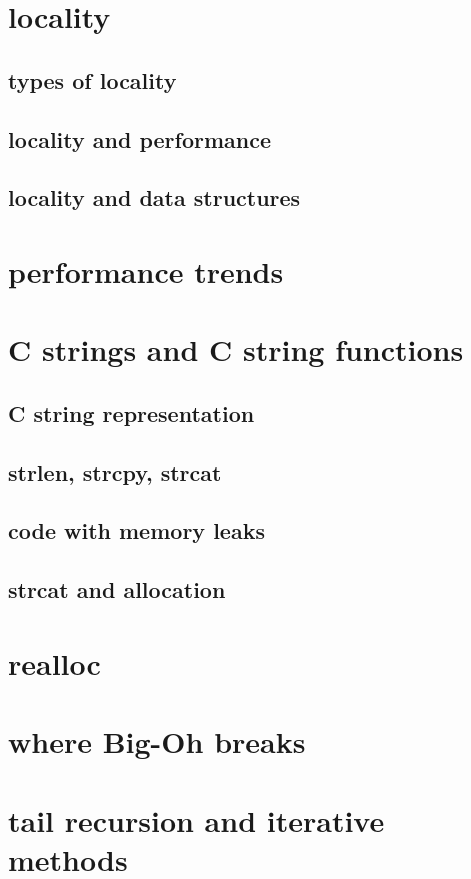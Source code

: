 

\section{locality}

\subsection{types of locality}



\subsection{locality and performance}



\subsection{locality and data structures}



\section{performance trends}


\section{C strings and C string functions}

\subsection{C string representation}




\subsection{strlen, strcpy, strcat}



\subsection{code with memory leaks}



\subsection{strcat and allocation}

\section{realloc}

\section{where Big-Oh breaks}

\section{tail recursion and iterative methods}


